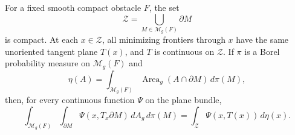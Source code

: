 \begin{lemma}
\label{ct:compatible-planes}
For a fixed smooth compact obstacle $F$, the set
\[
 \mathcal Z=\bigcup_{M\in\mathcal M_g(F)}\partial M
\]
is compact. At each $x\in\mathcal Z$, all minimizing frontiers through
$x$ have the same unoriented tangent plane $T(x)$, and $T$ is continuous
on $\mathcal Z$. If $\pi$ is a Borel probability measure on
$\mathcal M_g(F)$ and
\[
 \eta(A)=\int_{\mathcal M_g(F)}
          \operatorname{Area}_g(A\cap\partial M)\,d\pi(M),
\]
then, for every continuous function $\Psi$ on the plane bundle,
\begin{equation}
\label{ct:averaged-plane}
 \int_{\mathcal M_g(F)}\int_{\partial M}
        \Psi(x,T_x\partial M)\,dA_g\,d\pi(M)
 =\int_{\mathcal Z}\Psi(x,T(x))\,d\eta(x).
\end{equation}
\end{lemma}

